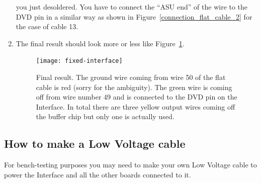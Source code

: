 \begin{enumerate}
  you just desoldered. You have to connect the ``ASU end'' of the wire to the
  DVD pin in a similar way as shown in Figure~\ref{connection_flat_cable_2} for
  the case of cable 13.
\item The final result should look more or less like
  Figure~\ref{fixed-interface}.
  \begin{figure}[H]
    \centering \texttt{[image: fixed-interface]}
    \caption{Final result. The ground wire coming from wire 50 of
      the flat cable is red (sorry for the ambiguity). The green
      wire is coming off from wire number 49 and is connected to the DVD pin on
      the Interface. In total there are three yellow output wires coming off the
      buffer chip but only one is actually used.}\label{fixed-interface}
  \end{figure}
\end{enumerate}

\subsection{How to make a Low Voltage cable}\label{sec:how-make-low-voltage-cable}
For bench-testing purposes you may need to make your own Low Voltage cable to
power the Interface and all the other boards connected to it.

